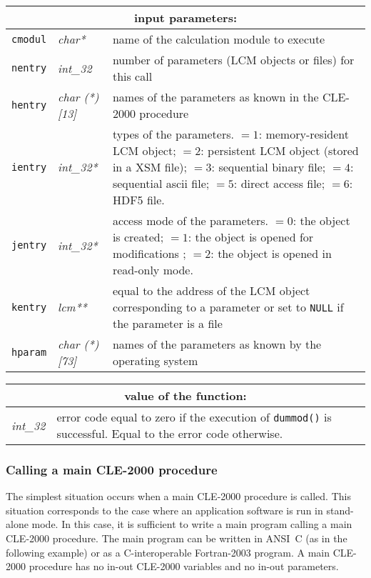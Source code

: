 \vskip 0.8cm

\noindent
\begin{tabular}{|p{1.5cm}|p{2cm}|p{11cm}|}
\hline
\multicolumn{3}{|c|}{\bf input parameters:} \\
\hline
{\tt cmodul} & {\it char*} & name of the calculation module to execute \\
\hline
{\tt nentry} & {\it int\_32} & number of parameters (LCM objects or files) for this call \\
\hline
{\tt hentry} & {\it char (*)[13]} & names of the parameters as known in the CLE-2000 procedure\\
\hline
{\tt ientry}  & {\it int\_32*} & types of the parameters. $=1$: memory-resident LCM object; $=2$: persistent LCM object (stored in a XSM file); 
$=3$: sequential binary file;
$=4$: sequential ascii file;
$=5$: direct access file;
$=6$: HDF5 file. \\
\hline
{\tt jentry}  & {\it int\_32*} & access mode of the parameters. $=0$: the object is created; $=1$: the object is opened for modifications ; $=2$: the object is opened in read-only mode. \\
\hline
{\tt kentry}  & {\it lcm**} & equal to the address of the LCM object corresponding to a parameter or set to {\tt NULL} if the parameter is a file \\
\hline
{\tt hparam}  & {\it char (*)[73]} &names of the parameters as known by the operating system  \\
\hline
\end{tabular}

\vskip 0.4cm

\noindent
\begin{tabular}{|p{4.0cm}|p{11cm}|}
\hline
\multicolumn{2}{|c|}{\bf value of the function:} \\
\hline
{\it int\_32} & error code equal to zero if the execution of {\tt dummod()} is successful. Equal to the error code otherwise. \\
\hline
\end{tabular}

\subsubsection {Calling a main CLE-2000 procedure}

The simplest situation occurs when a main CLE-2000 procedure is called. This situation corresponds to the case where an application
software is run in stand-alone mode. In this case, it is sufficient to write a main program calling a main CLE-2000 procedure. The main
program can be written in ANSI~C (as in the following example) or as a C-interoperable Fortran-2003 program. A main CLE-2000 procedure
has no in-out CLE-2000 variables and no in-out parameters.

